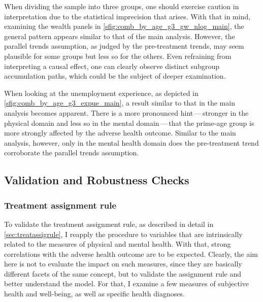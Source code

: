 When dividing the sample into three groups, one should exercise caution in interpretation due to the
statistical imprecision that arises. With that in mind, examining the wealth panels in
\cref{sfig:comb_by_age_g3_gw_nlog_main}, the general pattern appears similar to that of the main analysis.
However, the parallel trends assumption, as judged by the pre-treatment trends, may seem plausible for some
groups but less so for the others. Even refraining from interpreting a causal effect, one can clearly observe
distinct subgroup accumulation paths, which could be the subject of deeper examination.


When looking at the unemployment experience, as depicted in \cref{sfig:comb_by_age_g3_expue_main}, a result
similar to that in the main analysis becomes apparent. There is a more pronounced hint\,---\,stronger in the
physical domain and less so in the mental domain\,---\,that the prime-age group is more strongly affected by the
adverse health outcome. Similar to the main analysis, however, only in the mental health domain does the
pre-treatment trend corroborate the parallel trends assumption.


\subsection{Validation and Robustness Checks}
\label{sec:main_valid_robust}
\subsubsection{Treatment assignment rule}
\label{sec:validtreatrule}


To validate the treatment assignment rule, as described in detail in \cref{sec:treatassigrule}, I reapply the
procedure to variables that are intrinsically related to the measures of physical and mental health. With that,
strong correlations with the adverse health outcome are to be expected. Clearly, the aim here is not to
evaluate the impact on such measures, since they are basically different facets of the same concept, but to
validate the assignment rule and better understand the model. For that, I examine a few measures of subjective
health and well-being, as well as specific health diagnoses. 


